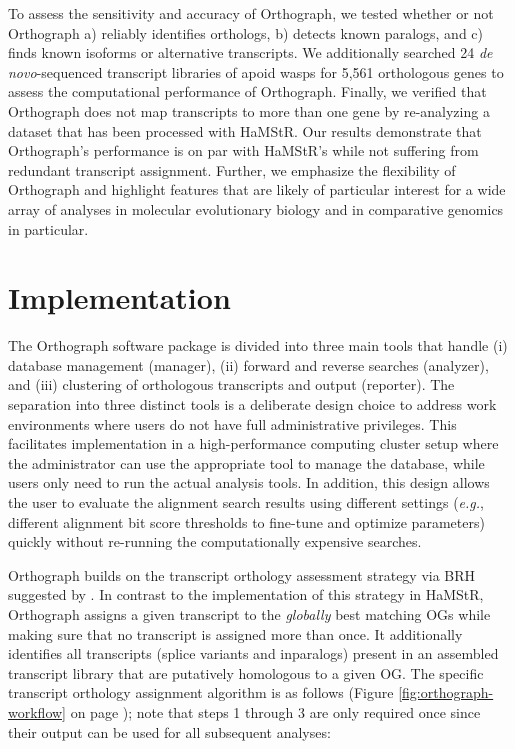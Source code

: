 To assess the sensitivity and accuracy of Orthograph, we tested whether
or not Orthograph a) reliably identifies orthologs, b) detects known
paralogs, and c) finds known isoforms or alternative transcripts. We
additionally searched 24 \emph{de novo}-sequenced transcript libraries
of apoid wasps for 5,561 orthologous genes to assess the computational
performance of Orthograph. Finally, we verified that Orthograph does not
map transcripts to more than one gene by re-analyzing a dataset that has
been processed with HaMStR. Our results demonstrate that Orthograph's
performance is on par with HaMStR's while not suffering from redundant
transcript assignment. Further, we emphasize the flexibility of
Orthograph and highlight features that are likely of particular interest
for a wide array of analyses in molecular evolutionary biology and in
comparative genomics in particular.

\section{Implementation}\label{implementation}

The Orthograph software package is divided into three main tools that
handle (i) database management (manager), (ii) forward and reverse
searches (analyzer), and (iii) clustering of orthologous transcripts and
output (reporter). The separation into three distinct tools is a
deliberate design choice to address work environments where users do not
have full administrative privileges. This facilitates implementation in
a high-performance computing cluster setup where the administrator can
use the appropriate tool to manage the database, while users only need
to run the actual analysis tools. In addition, this design allows the
user to evaluate the alignment search results using different settings
(\emph{e.g.}, different alignment bit score thresholds to fine-tune and
optimize parameters) quickly without re-running the computationally
expensive searches.

Orthograph builds on the transcript orthology assessment strategy via
BRH suggested by \cite{Ebersberger2009}. In contrast to the
implementation of this strategy in HaMStR, Orthograph assigns a given
transcript to the \emph{globally} best matching OGs while making sure
that no transcript is assigned more than once. It additionally
identifies all transcripts (splice variants and inparalogs) present in
an assembled transcript library that are putatively homologous to a
given OG. The specific transcript orthology assignment algorithm is as
follows (Figure \ref{fig:orthograph-workflow} on page
\pageref{fig:orthograph-workflow}); note that steps 1 through 3 are only
required once since their output can be used for all subsequent
analyses:


